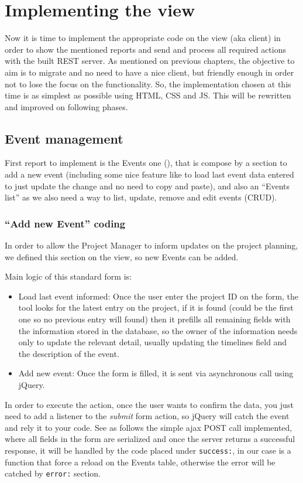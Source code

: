 \section{Implementing the view}
Now it is time to implement the appropriate code on the view (aka client) in
order to show the mentioned reports and send and process all required actions with
the built REST server. As mentioned on previous chapters, the objective to aim
is to migrate and no need to have a nice client, but friendly enough in order
not to lose the focus on the functionality. So, the implementation chosen at this
time is as simplest as possible using HTML, CSS and JS. This will be rewritten
and improved on following phases.

\subsection{Event management}
First report to implement is the Events one (), that
is compose by a section to add a new event (including some nice feature like to
load last event data entered to just update the change and no need to copy and
paste), and also an ``Events list'' as we also need a way to list, update,
remove and edit events (CRUD).

\subsubsection{``Add new Event'' coding}
In order to allow the Project Manager to inform updates on the project planning,
we defined this section on the view, so new Events can be added.

Main logic of this standard form is:
\begin{itemize}
  \item Load last event informed: Once the user enter the project ID on the
  form, the tool looks for the latest entry on the project, if it is found
  (could be the first one so no previous entry will found) then it prefills all
  remaining fields with the information stored in the database, so the owner of
  the information needs only to update  the relevant detail, usually updating
  the timelines field and the description of the event.
  \item Add new event: Once the form is filled, it is sent via asynchronous call
  using jQuery.
\end{itemize}

In order to execute the action, once the user wants to confirm the data, you
just need to add a listener to the \emph{submit} form action, so jQuery will
catch the event and rely it to your code. See as follows the simple ajax POST
call implemented, where all fields in the form are serialized and once the
server returns a successful response, it will be handled by the code placed
under \texttt{success:}, in our case is a function that force a reload on the Events
table, otherwise the error will be catched by \texttt{error:} section.
\\


